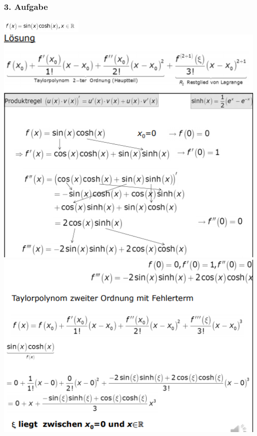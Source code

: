 \documentclass[12pt,a4paper]{article}
\begin{document}
\subsubsection{3. Aufgabe}
\includegraphics[width=0.3\textwidth]{Bilder/S1/18.png}\\
\includegraphics[width=1\textwidth]{Bilder/S1/19.png}\\
\includegraphics[width=1\textwidth]{Bilder/S1/20.png}\\
\includegraphics[width=1\textwidth]{Bilder/S1/21.png}\\
\end{document}
